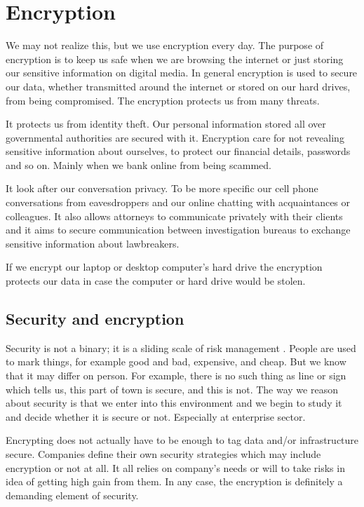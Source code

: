 \documentclass[../xdudla00-porting-Tang-to-Open-WRT.tex]{subfiles}
\begin{document}
\chapter{Encryption}\label{encryption}


We may not realize this, but we use encryption every day.
The purpose of encryption is to keep us safe when we are browsing the internet or just storing our sensitive information on digital media. 
In general encryption is used to secure our data, whether transmitted around the internet or stored on our hard drives, from being compromised.
The encryption protects us from many threats.

It protects us from identity theft. 
Our personal information stored all over governmental authorities are secured with it.
Encryption care for not revealing sensitive information about ourselves, to protect our financial details, passwords and so on. 
Mainly when we bank online from being scammed.

It look after our conversation privacy. 
To be more specific our cell phone conversations from eavesdroppers and our online chatting with acquaintances or colleagues. 
It also allows attorneys to communicate privately with their clients and it aims to secure communication between investigation bureaus to exchange sensitive information about lawbreakers.

If we encrypt our laptop or desktop computer's hard drive the encryption protects our data in case the computer or hard drive would be stolen.

\section{Security and encryption}

Security is not a binary; it is a sliding scale of risk management \cite{devconf}.
People are used to mark things, for example good and bad, expensive, and cheap.
But we know that it may differ on person.
For example, there is no such thing as line or sign which tells us, this part of town is secure, and this is not. 
The way we reason about security is that we enter into this environment and we begin to study it and decide whether it is secure or not. 
Especially at enterprise sector. 

Encrypting does not actually have to be enough to tag data and/or infrastructure secure.
Companies define their own security strategies which may include encryption or not at all. 
It all relies on company's needs or will to take risks in idea of getting high gain from them.
In any case, the encryption is definitely a demanding element of security.
\end{document}
